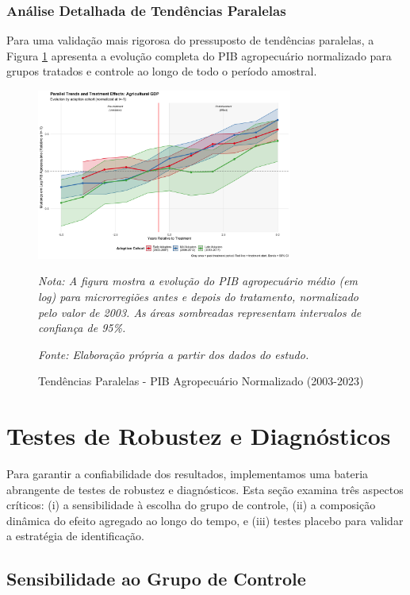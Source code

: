 \documentclass[
	12pt,				%
	oneside,			%
	a4paper,			%
	english,			%
	french,				%
	spanish,			%
	brazil				%
	]{abntex2}
\begin{document}
\subsubsection{Análise Detalhada de Tendências Paralelas}

Para uma validação mais rigorosa do pressuposto de tendências paralelas, a Figura \ref{fig:parallel_trends} apresenta a evolução completa do PIB agropecuário normalizado para grupos tratados e controle ao longo de todo o período amostral.

\begin{figure}[H]
\centering
\caption{Tendências Paralelas - PIB Agropecuário Normalizado (2003-2023)}
\label{fig:parallel_trends}
\includegraphics[width=0.75\textwidth]{../../../data/outputs/parallel_trends_complete_pib_agro_normalized.png}

\textit{Nota: A figura mostra a evolução do PIB agropecuário médio (em log) para microrregiões antes e depois do tratamento, normalizado pelo valor de 2003. As áreas sombreadas representam intervalos de confiança de 95\%.}

\textit{Fonte: Elaboração própria a partir dos dados do estudo.}
\end{figure}

\FloatBarrier
\section{Testes de Robustez e Diagnósticos}

Para garantir a confiabilidade dos resultados, implementamos uma bateria abrangente de testes de robustez e diagnósticos. Esta seção examina três aspectos críticos: (i) a sensibilidade à escolha do grupo de controle, (ii) a composição dinâmica do efeito agregado ao longo do tempo, e (iii) testes placebo para validar a estratégia de identificação.

\subsection{Sensibilidade ao Grupo de Controle}
\end{document}
